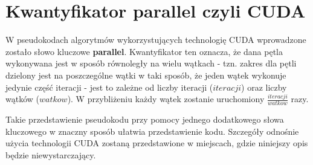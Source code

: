 \section{Kwantyfikator parallel czyli CUDA}

W pseudokodach algorytmów wykorzystujących technologię CUDA wprowadzone zostało słowo kluczowe \textbf{parallel}. Kwantyfikator ten oznacza, że dana pętla wykonywana jest w sposób równoległy na wielu wątkach - tzn. zakres dla pętli dzielony jest na poszczególne wątki w taki sposób, że jeden wątek wykonuje jedynie część iteracji - jest to zależne od liczby iteracji ($iteracji$) oraz liczby wątków ($watkow$). W przybliżeniu każdy wątek zostanie uruchomiony $\frac{iteracji}{watkow}$ razy.

Takie przedstawienie pseudokodu przy pomocy jednego dodatkowego słowa kluczowego w znaczny sposób ułatwia przedstawienie kodu. Szczegóły odnośnie użycia technologii CUDA zostaną przedstawione w miejscach, gdzie niniejszy opis będzie niewystarczający.
